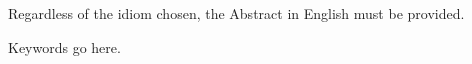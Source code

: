 \abstract
Regardless of the idiom chosen, the Abstract in English must be provided.\\

\begin{keywords}
Keywords go here.
\end{keywords}